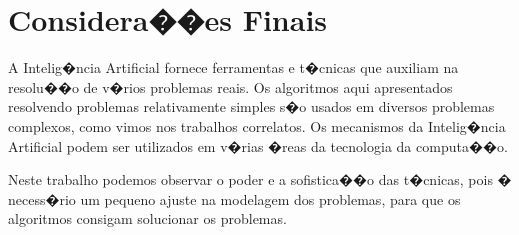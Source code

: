 \documentclass[12pt]{article}
\begin{document}





\section{Considera��es Finais}
\label{sec:conclusao}

A Intelig�ncia Artificial fornece ferramentas e t�cnicas que auxiliam na resolu��o de v�rios problemas reais. Os algoritmos aqui apresentados resolvendo problemas relativamente simples s�o usados em diversos problemas complexos, como vimos nos trabalhos correlatos. Os mecanismos da Intelig�ncia Artificial podem ser utilizados em v�rias �reas da tecnologia da computa��o.

Neste trabalho podemos observar o poder e a sofistica��o das t�cnicas, pois � necess�rio um pequeno ajuste na modelagem dos problemas, para que os algoritmos consigam solucionar os problemas.

% 


\end{document}
